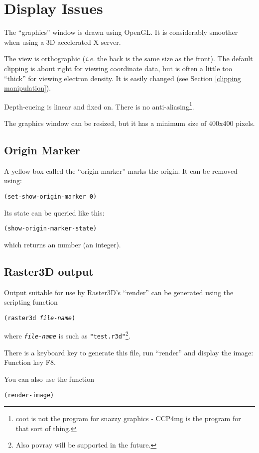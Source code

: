 \documentclass{book}
\begin{document}
\section{Display Issues}
The ``graphics'' window is drawn using OpenGL.  It is
considerably smoother when using a 3D accelerated X server. 

The view is orthographic (\emph{i.e.} the back is the same size as the
front).  The default clipping is about right for viewing coordinate
data, but is often a little too ``thick'' for viewing electron
density.  It is easily changed (see Section \ref{clipping
  manipulation}).

Depth-cueing is linear and fixed on. There is no
anti-aliasing\footnote{coot is not the program for snazzy graphics -
  CCP4mg is the program for that sort of thing.}.

The graphics window can be resized, but it has a minimum size of
400x400 pixels.

\subsection{Origin Marker}

A yellow box called the ``origin
marker'' marks the origin.  It can be removed
using:

\texttt{(set-show-origin-marker 0)}

Its state can be queried like this:

\texttt{(show-origin-marker-state)}

which returns an number (an integer).

\subsection{Raster3D output}
\label{Raster3D}Output suitable for use by Raster3D's
``render'' can be generated using the scripting function

\texttt{(raster3d \emph{file-name})}

where \texttt{\emph{file-name}} is such as
\texttt{"test.r3d"}\footnote{Also povray will be supported in the
  future.}.

There is a keyboard key to generate this file, run ``render'' and
display the image: Function key F8.

You can also use the function

\texttt{(render-image)}
\end{document}

